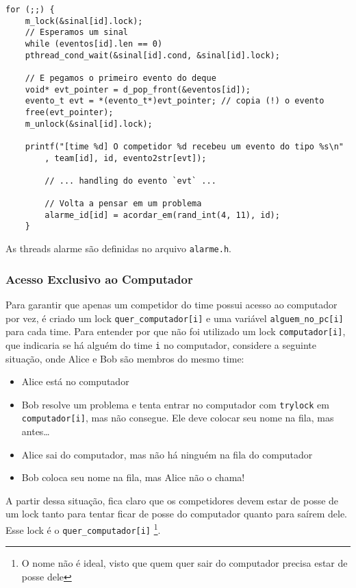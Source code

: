 \documentclass[11pt]{article}
\newcommand{\code}{\lstinline[mathescape=true]}
\begin{document}
\begin{lstlisting}[caption=Implementação da espera por um evento no código do competidor]
for (;;) {
	m_lock(&sinal[id].lock);
	// Esperamos um sinal
	while (eventos[id].len == 0)
	pthread_cond_wait(&sinal[id].cond, &sinal[id].lock);

	// E pegamos o primeiro evento do deque
	void* evt_pointer = d_pop_front(&eventos[id]);
	evento_t evt = *(evento_t*)evt_pointer; // copia (!) o evento
	free(evt_pointer);
	m_unlock(&sinal[id].lock);

	printf("[time %d] O competidor %d recebeu um evento do tipo %s\n"
		, team[id], id, evento2str[evt]);

		// ... handling do evento `evt` ...

		// Volta a pensar em um problema
		alarme_id[id] = acordar_em(rand_int(4, 11), id);
	}
	\end{lstlisting}

	As threads alarme são definidas no arquivo \code{alarme.h}. 

	\subsubsection{Acesso Exclusivo ao Computador}
	Para garantir que apenas um competidor do time possui acesso ao computador por vez, é criado um lock
	\code{quer_computador[i]} e uma variável \code{alguem_no_pc[i]} para cada time. Para entender por que
	não foi utilizado um lock \code{computador[i]}, que indicaria se há alguém do time \code{i} no
	computador, considere a seguinte situação, onde Alice e Bob são membros do mesmo time:

	\begin{itemize}
		\item Alice está no computador
		\item Bob resolve um problema e tenta entrar no computador com \code{trylock} em
			\code{computador[i]}, mas não consegue. Ele deve colocar seu nome na fila, mas antes\dots
		\item Alice sai do computador, mas não há ninguém na fila do computador
		\item Bob coloca seu nome na fila, mas Alice não o chama!
	\end{itemize}

	A partir dessa situação, fica claro que os competidores devem estar de posse de um lock tanto para
	tentar ficar de posse do computador quanto para saírem dele. Esse lock é o \code{quer_computador[i]}
	\footnote{O nome não é ideal, visto que quem quer sair do computador precisa estar de posse dele}.
\end{document}
